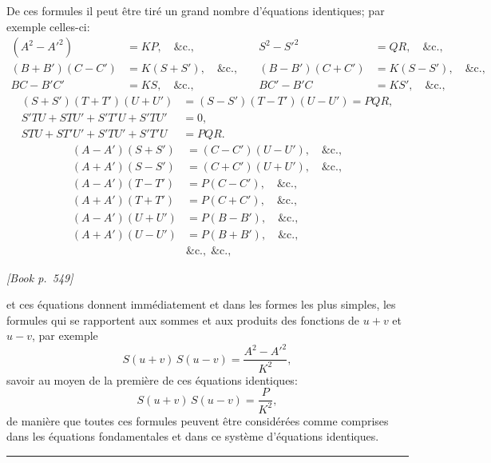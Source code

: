 \documentclass[11pt]{article}
\begin{document}
De ces formules il peut \^etre tir\'e un grand nombre d'\'equations identiques; par exemple celles-ci:
\[
\begin{aligned}
(A^{2} - A'^{2}) &= KP,\quad \&\text{c.},\quad & S^{2} - S'^{2} &= QR,\quad \&\text{c.},\\
(B + B')(C - C') &= K(S + S'),\quad \&\text{c.},\quad & (B - B')(C + C') &= K(S - S'),\quad \&\text{c.},\\
BC - B'C' &= KS,\quad \&\text{c.},\quad & BC' - B'C &= KS',\quad \&\text{c.},
\end{aligned}
\]
\[
\begin{aligned}
(S + S')(T + T')(U + U') &= (S - S')(T - T')(U - U') = PQR,\\
S'TU + STU' + S'T'U + S'TU' &= 0,\\
STU + ST'U' + S'TU' + S'T'U &= PQR.
\end{aligned}
\]
\[
\begin{aligned}
(A - A')(S + S') &= (C - C')(U - U'),\quad \&\text{c.},\\
(A + A')(S - S') &= (C + C')(U + U'),\quad \&\text{c.},\\
(A - A')(T - T') &= P(C - C'),\quad \&\text{c.},\\
(A + A')(T + T') &= P(C + C'),\quad \&\text{c.},\\
(A - A')(U + U') &= P(B - B'),\quad \&\text{c.},\\
(A + A')(U - U') &= P(B + B'),\quad \&\text{c.},\\
&\&\text{c.},\;\&\text{c.},
\end{aligned}
\]

\medskip
\noindent\textit{[Book p.~549]}\hfill

\smallskip

\noindent et ces \'equations donnent imm\'ediatement et dans les formes les plus simples, les formules qui se rapportent aux sommes et aux produits des fonctions de $u + v$ et $u - v$, par exemple
\[
S(u + v)\,S(u - v) = \frac{A^{2} - A'^{2}}{K^{2}},
\]
savoir au moyen de la premi\`ere de ces \'equations identiques:
\[
S(u + v)\,S(u - v) = \frac{P}{K^{2}},
\]
de mani\`ere que toutes ces formules peuvent \^etre consid\'er\'ees comme comprises dans les \'equations fondamentales et dans ce syst\`eme d'\'equations identiques.

\bigskip
\hrule
\bigskip

\end{document}
